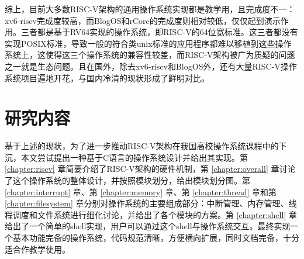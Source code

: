 综上，目前大多数RISC-V架构的通用操作系统实现都是教学用，且完成度不一：xv6-riscv完成度较高，而BlogOS和rCore的完成度则相对较低，仅仅起到演示作用。三者都是基于RV64实现的操作系统，即RISC-V的64位宽标准。这三者都没有实现POSIX标准\cite{DBLP:journals/computer/Isaak90a}，导致一般的符合类unix标准的应用程序都难以移植到这些操作系统上，这使得这三个操作系统的兼容性较差，而RISC-V架构被广为质疑的问题之一就是生态问题。且在国外，除去xv6-riscv和BlogOS外，还有大量RISC-V操作系统项目遍地开花，与国内冷清的现状形成了鲜明对比。

\section{研究内容}

基于上述的现状，为了进一步推动RISC-V架构在我国高校操作系统课程中的下沉，本文尝试提出一种基于C语言的操作系统设计并给出其实现。第 \ref{chapter:riscv} 章简要介绍了RISC-V架构的硬件机制，第 \ref{chapter:overall} 章讨论了这个操作系统的整体设计，并按照模块划分，给出模块划分图。第 \ref{chapter:interrupt} 章、第 \ref{chapter:memory} 章、第 \ref{chapter:thread} 章和第 \ref{chapter:filesystem} 章分别对操作系统的主要组成部分：中断管理、内存管理、线程调度和文件系统进行细化讨论，并给出了各个模块的方案。第 \ref{chapter:shell} 章给出了一个简单的shell实现，用户可以通过这个shell与操作系统交互。最终实现一个基本功能完备的操作系统，代码规范清晰，方便横向扩展，同时文档完备，十分适合作教学使用。
